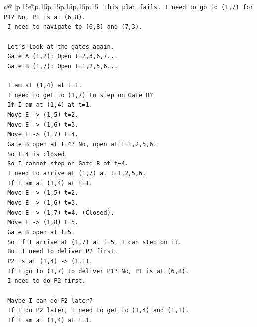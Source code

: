 \documentclass{article}
\begin{document}
{\begin{supertabular}{c@{$\;$}|p{.15\linewidth}@{}p{.15\linewidth}p{.15\linewidth}p{.15\linewidth}p{.15\linewidth}p{.15\linewidth}}
{{{\texttt{   This plan fails. I need to go to (1,7) for P1? No, P1 is at (6,8).} \\
\texttt{   I need to navigate to (6,8) and (7,3).} \\
\\ 
\texttt{   Let's look at the gates again.} \\
\texttt{   Gate A (1,2): Open t=2,3,6,7...} \\
\texttt{   Gate B (1,7): Open t=1,2,5,6...} \\
\\ 
\texttt{   I am at (1,4) at t=1.} \\
\texttt{   I need to get to (1,7) to step on Gate B?} \\
\texttt{   If I am at (1,4) at t=1.} \\
\texttt{   Move E {-}> (1,5) t=2.} \\
\texttt{   Move E {-}> (1,6) t=3.} \\
\texttt{   Move E {-}> (1,7) t=4.} \\
\texttt{   Gate B open at t=4? No, open at t=1,2,5,6.} \\
\texttt{   So t=4 is closed.} \\
\texttt{   So I cannot step on Gate B at t=4.} \\
\texttt{   I need to arrive at (1,7) at t=1,2,5,6.} \\
\texttt{   If I am at (1,4) at t=1.} \\
\texttt{   Move E {-}> (1,5) t=2.} \\
\texttt{   Move E {-}> (1,6) t=3.} \\
\texttt{   Move E {-}> (1,7) t=4. (Closed).} \\
\texttt{   Move E {-}> (1,8) t=5.} \\
\texttt{   Gate B open at t=5.} \\
\texttt{   So if I arrive at (1,7) at t=5, I can step on it.} \\
\texttt{   But I need to deliver P2 first.} \\
\texttt{   P2 is at (1,4) {-}> (1,1).} \\
\texttt{   If I go to (1,7) to deliver P1? No, P1 is at (6,8).} \\
\texttt{   I need to do P2 first.} \\
\\ 
\texttt{   Maybe I can do P2 later?} \\
\texttt{   If I do P2 later, I need to get to (1,4) and (1,1).} \\
\texttt{   If I am at (1,4) at t=1.} \\
}}}
\end{supertabular}}
\end{document}
